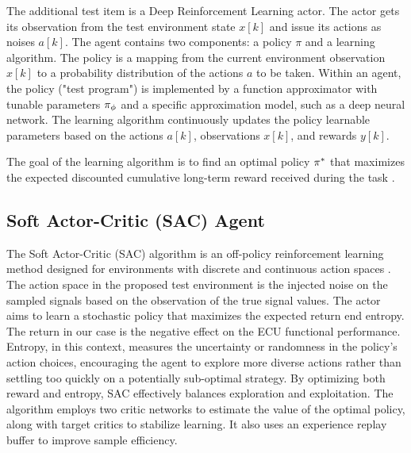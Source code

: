 \documentclass[a4paper, fleqn]{template/cas-dc}
\begin{document}
	The additional test item is a Deep Reinforcement Learning actor. The actor gets its observation from the test environment state $x[k]$ and issue its actions as noises $a[k]$.
	The agent contains two components: a policy $\pi$ and a learning algorithm.
	The policy is a mapping from the current environment observation $x[k]$ to a probability distribution of the actions $a$ to be taken. Within an agent, the policy ("test program") is implemented by a function approximator with tunable parameters $\pi_{\phi}$ and a specific approximation model, such as a deep neural network.
	The learning algorithm continuously updates the policy learnable parameters based on the actions $a[k]$, observations $x[k]$, and rewards $y[k]$. 
	
	The goal of the learning algorithm is to find an optimal policy $\pi^*$ that maximizes the expected discounted cumulative long-term reward received during the task \cite{sutton1998reinforcement}.
	
	\subsection{Soft Actor-Critic (SAC) Agent}
	The Soft Actor-Critic (SAC) algorithm is an off-policy reinforcement learning method designed for environments with discrete and continuous action spaces \cite{christodoulou2019soft, haarnoja2018soft}. The action space in the proposed test environment is the injected noise on the sampled signals based on the observation of the true signal values. The actor aims to learn a stochastic policy that maximizes the expected return end entropy. The return in our case is the negative effect on the ECU functional performance. Entropy, in this context, measures the uncertainty or randomness in the policy’s action choices, encouraging the agent to explore more diverse actions rather than settling too quickly on a potentially sub-optimal strategy. By optimizing both reward and entropy, SAC effectively balances exploration and exploitation. The algorithm employs two critic networks to estimate the value of the optimal policy, along with target critics to stabilize learning. It also uses an experience replay buffer to improve sample efficiency.
	
\end{document}
